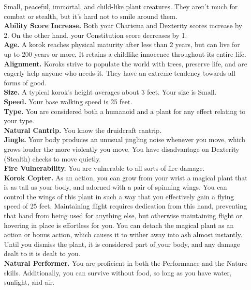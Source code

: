\documentclass[10pt,twoside,twocolumn,openany]{book}
\begin{document}
Small, peaceful, immortal, and child-like plant creatures. They aren't much for combat or stealth, but it's hard not to smile around them.\\
\indent \textbf{Ability Score Increase.} Both your Charisma and Dexterity scores increase by 2. On the other hand, your Constitution score decreases by 1.\\
\indent \textbf{Age.} A korok reaches physical maturity after less than 2 years, but can live for up to 200 years or more. It retains a childlike innocence throughout its entire life.\\
\indent \textbf{Alignment.} Koroks strive to populate the world with trees, preserve life, and are eagerly help anyone who needs it. They have an extreme tendency towards all forms of good.\\
\indent \textbf{Size.} A typical korok’s height averages about 3 feet. Your size is Small.\\
\indent \textbf{Speed.} Your base walking speed is 25 feet.\\
\indent \textbf{Type.} You are considered both a humanoid and a plant for any effect relating to your type.\\
\indent \textbf{Natural Cantrip.} You know the druidcraft cantrip.\\
\indent \textbf{Jingle.} Your body produces an unusual jingling noise whenever you move, which grows louder the more violently you move. You have disadvantage on Dexterity (Stealth) checks to move quietly.\\
\indent \textbf{Fire Vulnerability.} You are vulnerable to all sorts of fire damage. \\
\indent \textbf{Korok Copter.} As an action, you can grow from your wrist a magical plant that is as tall as your body, and adorned with a pair of spinning wings. You can control the wings of this plant in such a way that you effectively gain a flying speed of 25 feet. Maintaining flight requires dedication from this hand, preventing that hand from being used for anything else, but otherwise maintaining flight or hovering in place is effortless for you. You can detach the magical plant as an action or bonus action, which causes it to wither away into ash almost instantly. Until you dismiss the plant, it is considered part of your body, and any damage dealt to it is dealt to you.\\
\indent \textbf{Natural Performer.} You are proficient in both the Performance and the Nature skills. Additionally, you can survive without food, so long as you have water, sunlight, and air.\\
\end{document}
